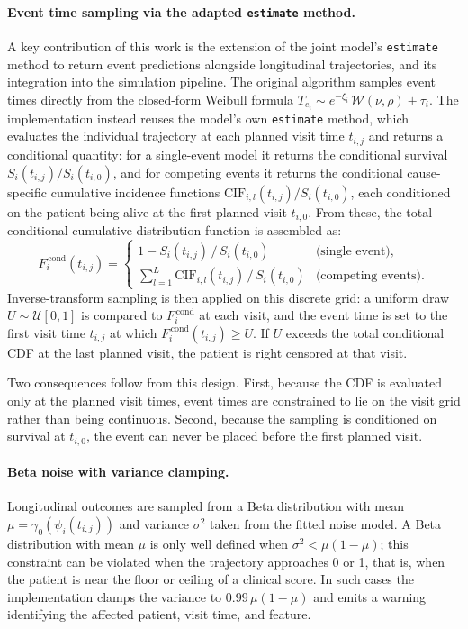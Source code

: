 \documentclass{rapportCS}
\begin{document}
\paragraph{Event time sampling via the adapted \texttt{estimate} method.}
A key contribution of this work is the extension of the joint model's \texttt{estimate} method to return event predictions alongside longitudinal trajectories, and its integration into the simulation pipeline. The original algorithm samples event times directly from the closed-form Weibull formula $T_{e_i} \sim e^{-\xi_i}\,\mathcal{W}(\nu, \rho) + \tau_i$. The implementation instead reuses the model's own \texttt{estimate} method, which evaluates the individual trajectory at each planned visit time $t_{i,j}$ and returns a conditional quantity: for a single-event model it returns the conditional survival $S_i(t_{i,j})/S_i(t_{i,0})$, and for competing events it returns the conditional cause-specific cumulative incidence functions $\text{CIF}_{i,l}(t_{i,j})/S_i(t_{i,0})$, each conditioned on the patient being alive at the first planned visit $t_{i,0}$. From these, the total conditional cumulative distribution function is assembled as:
\begin{equation}
F_i^{\,\text{cond}}(t_{i,j}) = 
\begin{cases}
1 - S_i(t_{i,j})\,/\,S_i(t_{i,0}) & \text{(single event),} \\[4pt]
\displaystyle\sum_{l=1}^{L} \text{CIF}_{i,l}(t_{i,j})\,/\,S_i(t_{i,0}) & \text{(competing events).}
\end{cases}
\end{equation}
Inverse-transform sampling is then applied on this discrete grid: a uniform draw $U \sim \mathcal{U}[0,1]$ is compared to $F_i^{\,\text{cond}}$ at each visit, and the event time is set to the first visit time $t_{i,j}$ at which $F_i^{\,\text{cond}}(t_{i,j}) \geq U$. If $U$ exceeds the total conditional CDF at the last planned visit, the patient is right censored at that visit.

Two consequences follow from this design. First, because the CDF is evaluated only at the planned visit times, event times are constrained to lie on the visit grid rather than being continuous. Second, because the sampling is conditioned on survival at $t_{i,0}$, the event can never be placed before the first planned visit.

\paragraph{Beta noise with variance clamping.}
Longitudinal outcomes are sampled from a Beta distribution with mean $\mu = \gamma_0(\psi_i(t_{i,j}))$ and variance $\sigma^2$ taken from the fitted noise model. A Beta distribution with mean $\mu$ is only well defined when $\sigma^2 < \mu(1 - \mu)$; this constraint can be violated when the trajectory approaches 0 or 1, that is, when the patient is near the floor or ceiling of a clinical score. In such cases the implementation clamps the variance to $0.99\,\mu(1-\mu)$ and emits a warning identifying the affected patient, visit time, and feature.
\end{document}
